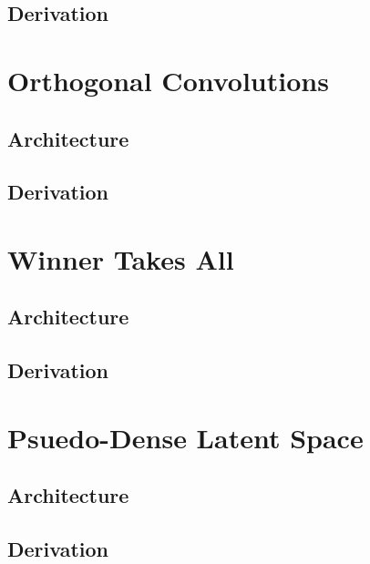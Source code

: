 \subsection{Derivation}

%
%
%
%
%
\section{Orthogonal Convolutions}
\lipsum[2]
\subsection{Architecture}
\subsection{Derivation}

%
%
%
%
%
\section{Winner Takes All}
\lipsum[2]
\subsection{Architecture}
\subsection{Derivation}

%
%
%
%
%
\section{Psuedo-Dense Latent Space}
\lipsum[2]
\subsection{Architecture}
\subsection{Derivation}
